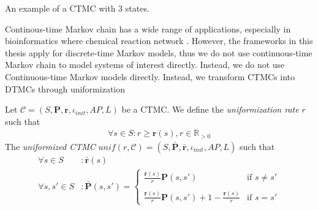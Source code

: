\begin{example}[CTMC]
      An example of a CTMC with 3 states.
      \begin{figure}[H]
            \centering
            \label{fig:ctmc}
      \end{figure}
      \label{example:ctmc}
\end{example}

Continous-time Markov chain has a wide range of applications, especially in bioinformatics where
chemical reaction network \cite{feinberg1980chemical} \cite{anderson2011continuous}. However, the
frameworks in this thesis apply for discrete-time Markov models, thus we do not use continuous-time
Markov chain to model systems of interest directly. Instead, we do not use Continuous-time Markov
models directly. Instead, we transform CTMCs into DTMCs through uniformization \cite{katoen2016probabilistic}
\begin{definition}
      Let $\mathcal{C} = (S,\mathbf{P}, \mathbf{r}, \iota_{init}, AP, L)$ be a CTMC. We define the
      \textit{uniformization rate} $r$ such that
      \begin{align*}
            \forall s\in S: r \geq \mathbf{r}(s), r\in\mathbb{R}_{>0}
      \end{align*}
      The \textit{uniformized CTMC} $unif(r, \mathcal{C})=(S, \bar{\mathbf{P}}, \bar{\mathbf{r}}, \iota_{init}, AP, L )$ such that
      \begin{align*}
            \forall s\in S     & : \bar{\mathbf{r}}(s)     \\
            \forall s, s'\in S & : \bar{\mathbf{P}}(s,s')=
            \begin{cases}
                  \frac{\mathbf{r}(s)}{r}\mathbf{P}(s,s')                               & \text{if $s \neq s'$} \\ \quad \\
                  \frac{\mathbf{r}(s)}{r}\mathbf{P}(s,s') + 1 - \frac{\mathbf{r}(s)}{r} & \text{if $s = s'$}
            \end{cases}
      \end{align*}
\end{definition}

